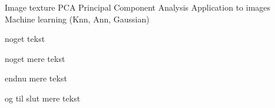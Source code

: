 


Image texture
PCA
Principal Component Analysis Application to images
Machine learning (Knn, Ann, Gaussian)


\small
noget tekst 

noget mere tekst 

endnu mere tekst 

og til slut mere tekst 
